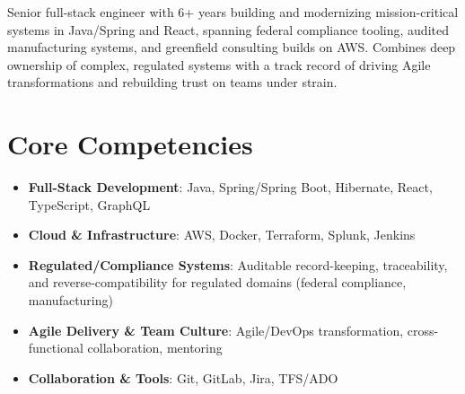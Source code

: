 \documentclass[11pt,a4paper,sans]{moderncv}
\begin{document}
\makecvtitle


\vspace{6pt}
\small{Senior full-stack engineer with 6+ years building and modernizing mission-critical systems in Java/Spring and React, spanning federal compliance tooling, audited manufacturing systems, and greenfield consulting builds on AWS. Combines deep ownership of complex, regulated systems with a track record of driving Agile transformations and rebuilding trust on teams under strain.}


\section{Core Competencies}
\vspace{1pt}
\begin{itemize}

\item \textbf{Full-Stack Development}: Java, Spring/Spring Boot, Hibernate, React, TypeScript, GraphQL

\item \textbf{Cloud \& Infrastructure}: AWS, Docker, Terraform, Splunk, Jenkins

\item \textbf{Regulated/Compliance Systems}: Auditable record-keeping, traceability, and reverse-compatibility for regulated domains (federal compliance, manufacturing)

\item \textbf{Agile Delivery \& Team Culture}: Agile/DevOps transformation, cross-functional collaboration, mentoring

\item \textbf{Collaboration \& Tools}: Git, GitLab, Jira, TFS/ADO

\end{itemize}

\end{document}
